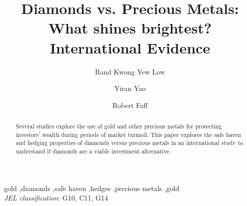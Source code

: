 \begin{frontmatter}
\title{Diamonds vs. Precious Metals:  What shines brightest? International Evidence}


\author[uqbs1]{Rand Kwong Yew Low}
\author[uqbs1]{Yiran Yao}
\author[uqbs1]{Robert Faff}

\address[uqbs1]{UQ Business School, University of Queensland, Brisbane, 4072, Australia}




\begin{abstract}
Several studies explore the use of gold and other precious metals for protecting investors' wealth during periods of market turmoil.
This paper explores the safe haven and hedging properties of diamonds versus precious metals in an international study to understand if diamonds are
a viable investment alternative.  





\end{abstract}




\begin{keyword}
gold \sep diamonds \sep safe haven \sep hedges \sep  precious metals \sep gold\\
\emph{JEL classification}: G10, C11, G14 \\
\end{keyword}

\end{frontmatter}
